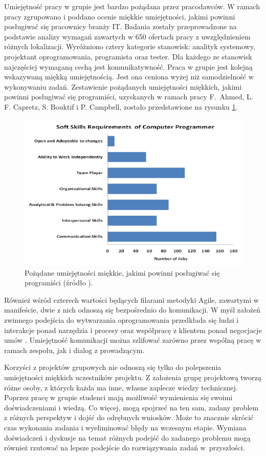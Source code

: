 Umiejętność pracy w grupie jest bardzo pożądana przez pracodawców.
W ramach pracy \cite{soft-skills} zgrupowano i poddano ocenie miękkie umiejętności, jakimi powinni posługiwać się pracownicy branży IT.
Badania zostały przeprowadzone na podstawie analizy wymagań zawartych w 650 ofertach pracy z uwzględnieniem różnych lokalizacji.
Wyróżniono cztery kategorie stanowisk: analityk systemowy, projektant oprogramowania, programista oraz tester.
Dla każdego ze stanowisk najczęściej wymaganą cechą jest komunikatywność.
Praca w grupie jest kolejną wskazywaną miękką umiejętnością.
Jest ona ceniona wyżej niż samodzielność w wykonywaniu zadań.
Zestawienie pożądanych umiejętności miękkich, jakimi powinni posługiwać się programiści, uzyskanych w ramach pracy F.~Ahmed, L. F. Capretz, S. Bouktif i P. Campbell, zostało przedstawione na rysunku \ref{fig:soft-skills}.

\begin{figure}[h]
    \centering
    \includegraphics[width = 13cm]{chapter02/soft-skills.png}
    \caption{Pożądane umiejętności miękkie, jakimi powinni posługiwać się programiści (źródło \cite{soft-skills}).}
    \label{fig:soft-skills}
\end{figure}

Również wśród czterech wartości będących filarami metodyki Agile, zawartymi w manifeście, dwie z nich odnoszą się bezpośrednio do komunikacji.
W myśl założeń zwinnego podejścia do wytwarzania oprogramowania przedkłada się ludzi i interakcje ponad narzędzia i procesy oraz współpracę z klientem ponad negocjacje umów \cite{agile-manifesto}.
Umiejętność komunikacji można szlifować zarówno przez wspólną pracę w ramach zespołu, jak i dialog z prowadzącym.

Korzyści z projektów grupowych nie odnoszą się tylko do polepszenia umiejętności miękkich uczestników projektu.
Z założenia grupę projektową tworzą różne osoby, z których każda ma inne, własne zaplecze wiedzy technicznej.
Poprzez pracę w grupie studenci mają możliwość wymienienia się swoimi doświadczeniami i wiedzą.
Co więcej, mogą spojrzeć na ten sam, zadany problem z różnych perspektyw i dojść do odrębnych wniosków.
Może to znacznie skrócić czas wykonania zadania i wyeliminować błędy na wczesnym etapie. 
Wymiana doświadczeń i dyskusje na temat różnych podejść do zadanego problemu mogą również rzutować na lepsze podejście do rozwiązywania zadań w~przyszłości.

